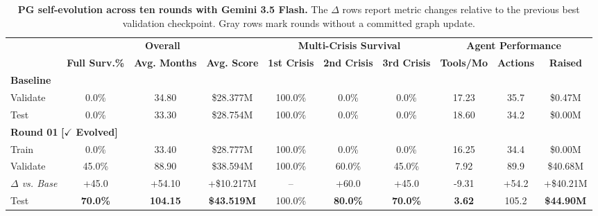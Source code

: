 \begin{table}[!htb]
\centering
\scriptsize
\setlength{\aboverulesep}{0pt}
\setlength{\belowrulesep}{0pt}
\renewcommand{\arraystretch}{1} 
\setlength{\tabcolsep}{3.5pt}
\caption{\textbf{PG self-evolution across ten rounds with Gemini 3.5 Flash.} The $\Delta$ rows report metric changes relative to the previous best validation checkpoint. Gray rows mark rounds without a committed graph update.}
\label{tab:evolution_rounds}
\begin{tabular}{l c c c c c c c c c}
\toprule
\rowcolor{GoogleRed!15}
\cellcolor{GoogleRed!15} & \multicolumn{3}{c}{\textbf{Overall}} & \multicolumn{3}{c}{\textbf{Multi-Crisis Survival}} & \multicolumn{3}{c}{\textbf{Agent Performance}} \\

\arrayrulecolor{white}
\cmidrule(lr){2-4} \cmidrule(lr){5-7} \cmidrule(lr){8-10}
\arrayrulecolor{black}

\rowcolor{GoogleRed!15}
\multirow{-2}{*}{\textbf{Evolution Round}} & \textbf{Full Surv.\%} & \textbf{Avg. Months} & \textbf{Avg. Score} & \textbf{1st Crisis} & \textbf{2nd Crisis} & \textbf{3rd Crisis} & \textbf{Tools/Mo} & \textbf{Actions} & \textbf{Raised} \\
\midrule

\multicolumn{10}{l}{\textbf{Baseline}} \\
\quad Validate                  & 0.0\% & 34.80 & \$28.377M & 100.0\% & 0.0\% & 0.0\% & 17.23 & 35.7 & \$0.47M \\
\quad Test                      & 0.0\% & 33.30 & \$28.754M & 100.0\% & 0.0\% & 0.0\% & 18.60 & 34.2 & \$0.00M \\
\midrule

\multicolumn{10}{l}{\textbf{Round 01} \textcolor{GoogleGreen!65!black}{\textbf{[$\checkmark$ Evolved]}}} \\
\quad Train                     & 0.0\% & 33.40 & \$28.777M & 100.0\% & 0.0\% & 0.0\% & 16.25 & 34.4 & \$0.00M \\
\quad Validate                  & 45.0\% & 88.90 & \$38.594M & 100.0\% & 60.0\% & 45.0\% & 7.92 & 89.9 & \$40.68M \\
\quad \quad \textcolor{black!65}{\textit{\scriptsize $\Delta$ vs. Base}} & \textcolor{GoogleGreen!65!black}{\scriptsize +45.0} & \textcolor{GoogleGreen!65!black}{\scriptsize +54.10} & \textcolor{GoogleGreen!65!black}{\scriptsize +\$10.217M} & \textcolor{black!65}{\scriptsize --} & \textcolor{GoogleGreen!65!black}{\scriptsize +60.0} & \textcolor{GoogleGreen!65!black}{\scriptsize +45.0} & \textcolor{GoogleGreen!65!black}{\scriptsize -9.31} & \textcolor{GoogleGreen!65!black}{\scriptsize +54.2} & \textcolor{GoogleGreen!65!black}{\scriptsize +\$40.21M} \\
\quad Test                      & \textbf{70.0\%} & \textbf{104.15} & \textbf{\$43.519M} & 100.0\% & \textbf{80.0\%} & \textbf{70.0\%} & \textbf{3.62} & 105.2 & \textbf{\$44.90M} \\
\midrule


\end{tabular}
\end{table}
